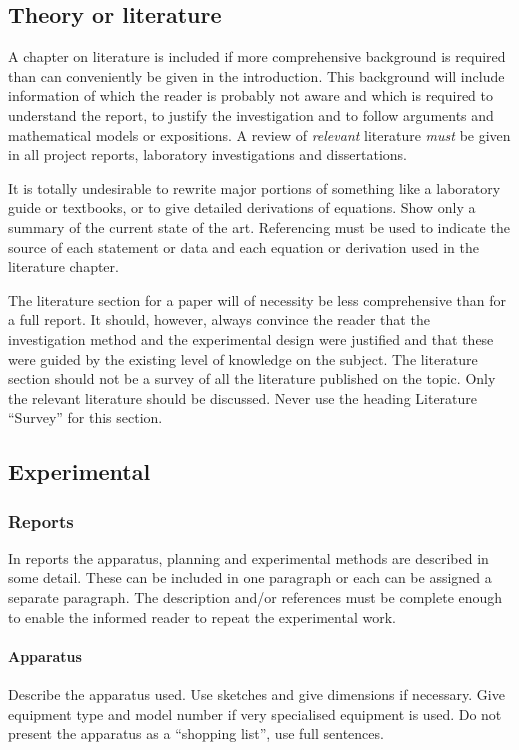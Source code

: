 \documentclass[a5paper, 10pt]{article}
\begin{document}
\subsection{Theory or literature}
\label{sec:literature}
A chapter on literature is included if more comprehensive background
is required than can conveniently be given in the introduction.  This
background will include information of which the reader is probably
not aware and which is required to understand the report, to justify
the investigation and to follow arguments and mathematical models or
expositions.  A review of \emph{relevant} literature \emph{must} be
given in all project reports, laboratory investigations and
dissertations.

It is totally undesirable to rewrite major portions of something like a
laboratory guide or textbooks, or to give detailed derivations of
equations.  Show only a summary of the current state of the art.
Referencing must be used to indicate the source of each statement or
data and each equation or derivation used in the literature chapter.

The literature section for a paper will of necessity be less
comprehensive than for a full report.  It should, however, always
convince the reader that the investigation method and the experimental
design were justified and that these were guided by the existing level
of knowledge on the subject.  The literature section should
not be a survey of all the literature published on the topic.  Only
the relevant literature should be discussed.  Never use the heading
Literature ``Survey'' for this section.

\subsection{Experimental}
\label{sec:experimental}
\subsubsection{Reports}

In reports the apparatus, planning and experimental methods are
described in some detail.  These can be included in one paragraph or
each can be assigned a separate paragraph.  The description and/or
references must be complete enough to enable the informed reader to
repeat the experimental work.

\paragraph{Apparatus} 
Describe the apparatus used.  Use sketches and give dimensions if
necessary.  Give equipment type and model number if very specialised
equipment is used.  Do not present the apparatus as a ``shopping
list'', use full sentences.
\end{document}
